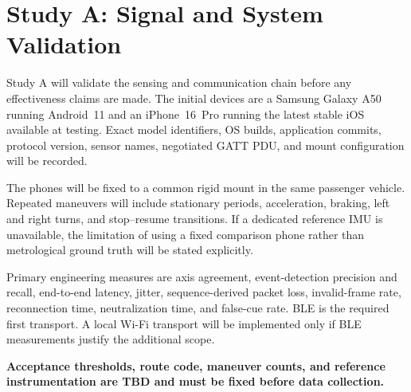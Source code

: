 \section{Study A: Signal and System Validation}
\label{sec:study-a}

Study A will validate the sensing and communication chain before any effectiveness claims are made. The initial devices are a Samsung Galaxy A50 running Android~11 and an iPhone~16~Pro running the latest stable iOS available at testing. Exact model identifiers, OS builds, application commits, protocol version, sensor names, negotiated GATT PDU, and mount configuration will be recorded.

The phones will be fixed to a common rigid mount in the same passenger vehicle. Repeated maneuvers will include stationary periods, acceleration, braking, left and right turns, and stop--resume transitions. If a dedicated reference IMU is unavailable, the limitation of using a fixed comparison phone rather than metrological ground truth will be stated explicitly.

Primary engineering measures are axis agreement, event-detection precision and recall, end-to-end latency, jitter, sequence-derived packet loss, invalid-frame rate, reconnection time, neutralization time, and false-cue rate. BLE is the required first transport. A local Wi-Fi transport will be implemented only if BLE measurements justify the additional scope.

\textbf{Acceptance thresholds, route code, maneuver counts, and reference instrumentation are TBD and must be fixed before data collection.}
